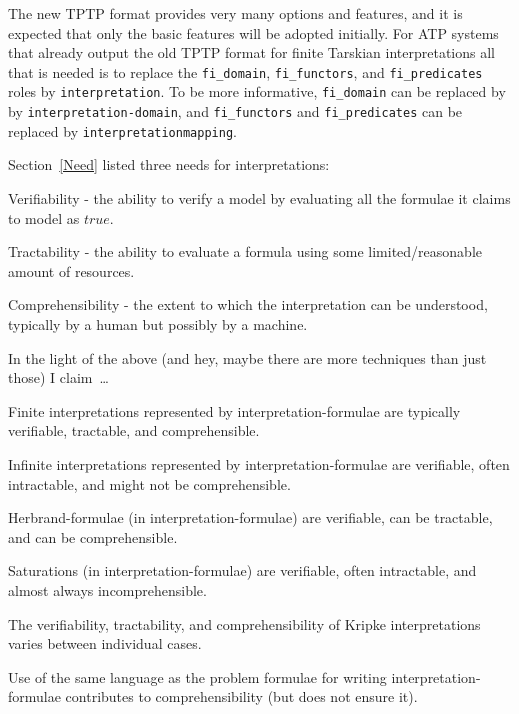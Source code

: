 \documentclass{easychair}
\newenvironment{packed_itemize}{
\vspace*{-0.3em}
\begin{itemize}
\setlength{\partopsep}{0pt}
\setlength{\itemsep}{1pt}
\setlength{\parskip}{0pt}
\setlength{\parsep}{0pt}
}{\end{itemize}}
\begin{document}
The new TPTP format provides very many options and features, and it is expected that only the 
basic features will be adopted initially. 
For ATP systems that already output the old TPTP format for finite Tarskian interpretations
all that is needed is to replace the {\tt fi\_domain}, {\tt fi\_functors}, and {\tt fi\_predicates}
roles by {\tt interpretation}. 
To be more informative, {\tt fi\_domain} can be replaced by by {\tt interpretation-domain}, and 
{\tt fi\_functors} and {\tt fi\_predicates} can be replaced by {\tt interpretation\-mapping}.

Section~\ref{Need} listed three needs for interpretations: 
\begin{packed_itemize}
\item Verifiability - the ability to verify a model by evaluating all the formulae it claims
      to model as $true$.
\item Tractability - the ability to evaluate a formula using some limited/reasonable amount of
      resources.
\item Comprehensibility - the extent to which the interpretation can be understood, typically
      by a human but possibly by a machine.
\end{packed_itemize}

In the light of the above (and hey, maybe there are more techniques than just those) I claim~\ldots
\begin{packed_itemize}
\item Finite interpretations represented by interpretation-formulae are typically verifiable, 
      tractable, and comprehensible.
\item Infinite interpretations represented by interpretation-formulae are verifiable, often 
      intractable, and might not be comprehensible.
\item Herbrand-formulae (in interpretation-formulae) are verifiable, can be tractable, and can 
      be comprehensible.
\item Saturations (in interpretation-formulae) are verifiable, often intractable, and almost 
      always incomprehensible.
\item The verifiability, tractability, and comprehensibility of Kripke interpretations varies
      between individual cases.
\item Use of the same language as the problem formulae for writing interpretation-formulae
      contributes to comprehensibility (but does not ensure it).
\end{packed_itemize}
\end{document}
